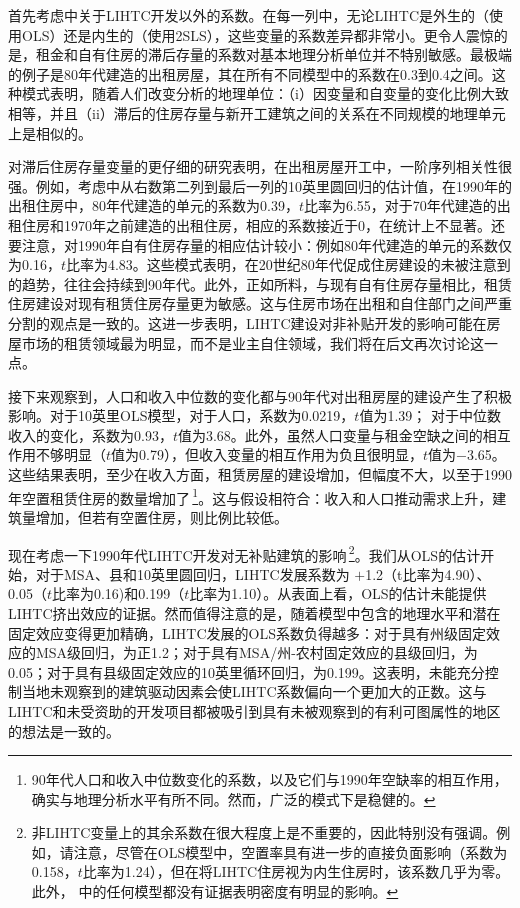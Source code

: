 \documentclass[lang=cn,11pt,a4paper]{paper}
\begin{document}
首先考虑中关于LIHTC开发以外的系数。在每一列中，无论LIHTC是外生的（使用OLS）还是内生的（使用2SLS），这些变量的系数差异都非常小。更令人震惊的是，租金和自有住房的滞后存量的系数对基本地理分析单位并不特别敏感。最极端的例子是80年代建造的出租房屋，其在所有不同模型中的系数在0.3到0.4之间。这种模式表明，随着人们改变分析的地理单位：（i）因变量和自变量的变化比例大致相等，并且（ii）滞后的住房存量与新开工建筑之间的关系在不同规模的地理单元上是相似的。

对滞后住房存量变量的更仔细的研究表明，在出租房屋开工中，一阶序列相关性很强。例如，考虑中从右数第二列到最后一列的10英里圆回归的估计值，在1990年的出租住房中，80年代建造的单元的系数为0.39，$t$比率为6.55，对于70年代建造的出租住房和1970年之前建造的出租住房，相应的系数接近于0，在统计上不显著。还要注意，对1990年自有住房存量的相应估计较小：例如80年代建造的单元的系数仅为0.16，$t$比率为4.83。这些模式表明，在20世纪80年代促成住房建设的未被注意到的趋势，往往会持续到90年代。此外，正如所料，与现有自有住房存量相比，租赁住房建设对现有租赁住房存量更为敏感。这与住房市场在出租和自住部门之间严重分割的观点是一致的。这进一步表明，LIHTC建设对非补贴开发的影响可能在房屋市场的租赁领域最为明显，而不是业主自住领域，我们将在后文再次讨论这一点。

接下来观察到，人口和收入中位数的变化都与90年代对出租房屋的建设产生了积极影响。对于10英里OLS模型，对于人口，系数为0.0219，$t$值为1.39； 对于中位数收入的变化，系数为0.93，$t$值为3.68。此外，虽然人口变量与租金空缺之间的相互作用不够明显（$t$值为0.79），但收入变量的相互作用为负且很明显，$t$值为$−$3.65。这些结果表明，至少在收入方面，租赁房屋的建设增加，但幅度不大，以至于1990年空置租赁住房的数量增加了\,\footnote{90年代人口和收入中位数变化的系数，以及它们与1990年空缺率的相互作用，确实与地理分析水平有所不同。然而，广泛的模式下是稳健的。}。这与假设相符合：收入和人口推动需求上升，建筑量增加，但若有空置住房，则比例比较低。

现在考虑一下1990年代LIHTC开发对无补贴建筑的影响\,\footnote{非LIHTC变量上的其余系数在很大程度上是不重要的，因此特别没有强调。例如，请注意，尽管在OLS模型中，空置率具有进一步的直接负面影响（系数为0.158，$t$比率为1.24），但在将LIHTC住房视为内生住房时，该系数几乎为零。此外， 中的任何模型都没有证据表明密度有明显的影响。}。我们从OLS的估计开始，对于MSA、县和10英里圆回归，LIHTC发展系数为 $+$1.2（t比率为4.90）、0.05（$t$比率为0.16)和0.199（$t$比率为1.10）。从表面上看，OLS的估计未能提供LIHTC挤出效应的证据。然而值得注意的是，随着模型中包含的地理水平和潜在固定效应变得更加精确，LIHTC发展的OLS系数负得越多：对于具有州级固定效应的MSA级回归，为正1.2；对于具有MSA/州-农村固定效应的县级回归，为0.05；对于具有县级固定效应的10英里循环回归，为0.199。这表明，未能充分控制当地未观察到的建筑驱动因素会使LIHTC系数偏向一个更加大的正数。这与LIHTC和未受资助的开发项目都被吸引到具有未被观察到的有利可图属性的地区的想法是一致的。
\end{document}
